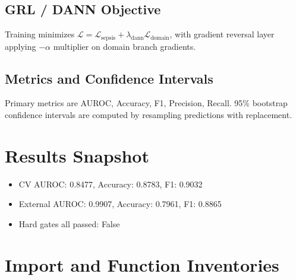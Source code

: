 \documentclass[11pt]{article}
\begin{document}
\subsection{GRL / DANN Objective}
Training minimizes $\mathcal{L} = \mathcal{L}_{\mathrm{sepsis}} + \lambda_{\mathrm{dann}}\mathcal{L}_{\mathrm{domain}}$, with gradient reversal layer applying $-\alpha$ multiplier on domain branch gradients.
\subsection{Metrics and Confidence Intervals}
Primary metrics are AUROC, Accuracy, F1, Precision, Recall. 95\% bootstrap confidence intervals are computed by resampling predictions with replacement.
\section{Results Snapshot}
\begin{itemize}
\item CV AUROC: 0.8477, Accuracy: 0.8783, F1: 0.9032
\item External AUROC: 0.9907, Accuracy: 0.7961, F1: 0.8865
\item Hard gates all passed: False
\end{itemize}
\section{Import and Function Inventories}
\end{document}

